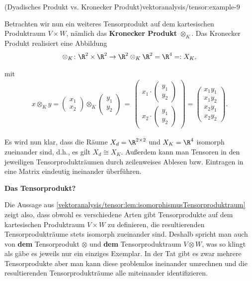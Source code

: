 \documentclass[letterpaper,10pt,german]{jupyterBook}
\begin{document}
\begin{example}{(Dyadisches Produkt vs. Kronecker Produkt)}{vektoranalysis/tensor:example-9}
\par
Betrachten wir nun ein weiteres Tensorprodukt auf dem kartesischen Produktraum \(V \times W\), nämlich das \textbf{Kronecker Produkt} \(\otimes_K\).
Das Kronecker Produkt realisiert eine Abbildung
\begin{align*}
\otimes_K \colon \R^2 \times \R^2 \rightarrow \R^2 \otimes_K \R^2 = \R^{4} =: X_K,
\end{align*}
\par
mit
\begin{align*}
x \otimes_K y =
\begin{pmatrix}
x_1 \\ x_2
\end{pmatrix} \otimes_K 
\begin{pmatrix}
y_1 \\ y_2
\end{pmatrix}
\, = \, 
\begin{pmatrix}
x_1 \cdot \begin{pmatrix} y_1 \\ y_2 \end{pmatrix} \\ 
x_2 \cdot \begin{pmatrix} y_1 \\ y_2 \end{pmatrix}
\end{pmatrix}
= 
\begin{pmatrix}
x_1y_1\\
x_1y_2\\
x_2y_1\\
x_2y_2
\end{pmatrix}.
\end{align*}
\par
Es wird nun klar, dass die Räume \(X_d = \R^{2 \times 2}\) und \(X_K = \R^4\) isomorph zueinander sind, d.h., es gilt \(X_d \cong X_K\).
Außerdem kann man Tensoren in den jeweiligen Tensorprodukträumen durch zeilenweises Ablesen bzw. Eintragen in eine Matrix eindeutig ineinander überführen.
\end{example}

\par
\textbf{Das Tensorprodukt?}

\par
Die Aussage aus \cref{vektoranalysis/tensor:lem:isomorphismusTensorproduktraum} zeigt also, dass obwohl es verschiedene Arten gibt Tensorprodukte auf dem kartesischen Produktraum \(V \times W\) zu definieren, die resultierenden Tensorprodukträume stets isomorph zueinander sind.
Deshalb spricht man auch von \textbf{dem} Tensorprodukt \(\otimes\) und \textbf{dem} Tensorproduktraum \(V \otimes W\), was so klingt als gäbe es jeweils nur ein einziges Exemplar.
In der Tat gibt es zwar mehrere Tensorprodukte aber man kann diese problemlos ineinander umrechnen und die resultierenden Tensorprodukträume alle miteinander identifizieren.
\end{document}
